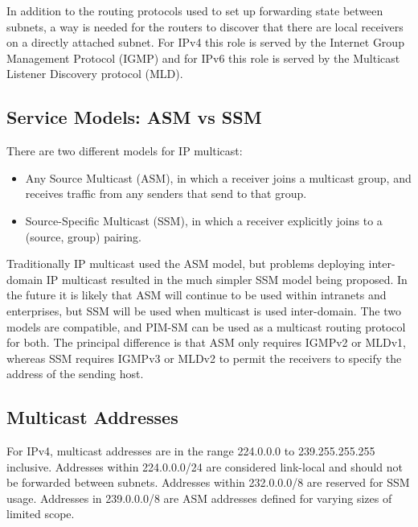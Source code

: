 In addition to the routing protocols used to set up forwarding state
between subnets, a way is needed for the routers to discover that
there are local receivers on a directly attached subnet.  For IPv4
this role is served by the Internet Group Management Protocol (IGMP)
and for IPv6 this role is served by the Multicast Listener Discovery
protocol (MLD).

\subsection{Service Models: ASM vs SSM}

There are two different models for IP multicast:
\begin{itemize}
\item Any Source Multicast (ASM), in which a receiver joins a
  multicast group, and receives traffic from any senders that send to
  that group.
\item Source-Specific Multicast (SSM), in which a receiver explicitly
  joins to a (source, group) pairing.
\end{itemize}
Traditionally IP multicast used the ASM model, but problems deploying
inter-domain IP multicast resulted in the much simpler SSM model being
proposed.  In the future it is likely that ASM will continue to be
used within intranets and enterprises, but SSM will be used when
multicast is used inter-domain.  The two models are compatible, and
PIM-SM can be used as a multicast routing protocol for both.  The
principal difference is that ASM only requires IGMPv2 or MLDv1,
whereas SSM requires IGMPv3 or MLDv2 to permit the receivers to
specify the address of the sending host.

\subsection{Multicast Addresses}

For IPv4, multicast addresses are in the range 224.0.0.0 to
239.255.255.255 inclusive.  Addresses within 224.0.0.0/24 are
considered link-local and should not be forwarded between subnets.
Addresses within 232.0.0.0/8 are reserved for SSM usage.  Addresses in
239.0.0.0/8 are ASM addresses defined for varying sizes of limited
scope.

